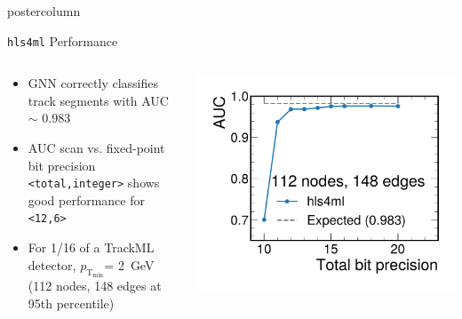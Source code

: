 \documentclass[final,hyperref={pdfpagelabels=false}]{beamer}
\newcommand{\hlsfml}{{\texttt{hls4ml}}\xspace}
\newcommand{\ptmin}{\ensuremath{p_{\mathrm{T_{min}}}}\xspace}
\begin{document}
\begin{frame}
\begin{columns}
\begin{column}{.33\textwidth}
\begin{beamercolorbox}[center,wd=\textwidth]{postercolumn}
\begin{minipage}[T]{.95\textwidth}
{            \begin{block}{\hlsfml Performance}
              \vspace{-1.2cm}
              \begin{columns}
                \begin{column}{.49\textwidth}
                  \begin{itemize}
                   \item GNN correctly classifies track segments with AUC $\sim$ 0.983
                  \item AUC scan vs. fixed-point bit precision \texttt{<total,integer>} shows good performance for \texttt{<12,6>}
                      \item For 1/16 of a TrackML detector, \ptmin = 2~GeV (112 nodes, 148 edges at 95th percentile)
                  \end{itemize}
                \end{column}
                \begin{column}{.49\textwidth}
                  \begin{center}
                      \includegraphics[width=\linewidth]{figures/AUC_vs_BP.pdf}
                  \end{center}
                \end{column}
              \end{columns}
              \vspace{-1.3cm}
            \end{block}
                }
              \end{minipage}
            \end{beamercolorbox}
          \end{column}


\end{columns}
\end{frame}
\end{document}

